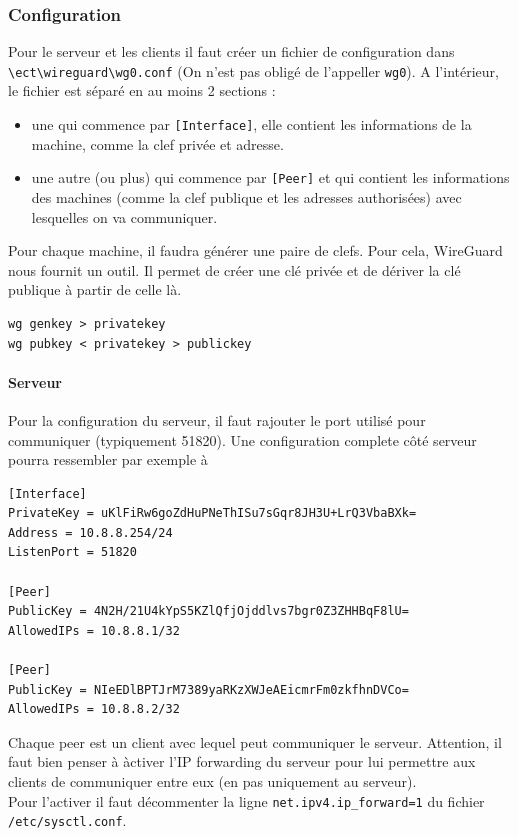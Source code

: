 \documentclass[a4paper, 12pt]{article}
\begin{document}
\subsubsection{Configuration}
Pour le serveur et les clients il faut créer un fichier de configuration dans \\\verb+\ect\wireguard\wg0.conf+ (On n'est pas obligé de l'appeller \verb+wg0+). A l'intérieur, le fichier est séparé en au moins 2 sections :
\begin{itemize}
\item une qui commence par \verb+[Interface]+, elle contient les informations de la machine, comme la clef privée et adresse.
\item une autre (ou plus) qui commence par \verb+[Peer]+ et qui contient les informations des machines (comme la clef publique et les adresses authorisées) avec lesquelles on va communiquer. \\
\end{itemize}

Pour chaque machine, il faudra générer une paire de clefs. Pour cela, WireGuard nous fournit un outil. Il permet de créer une clé privée et de dériver la clé publique à partir de celle là.

\begin{center}
\begin{minipage}{.6\linewidth}
\begin{lstlisting}[language = shell]
wg genkey > privatekey
wg pubkey < privatekey > publickey
\end{lstlisting}
\end{minipage}
\end{center}

\paragraph{Serveur}
Pour la configuration du serveur, il faut rajouter le port utilisé pour communiquer (typiquement 51820). Une configuration complete côté serveur pourra ressembler par exemple à

\begin{lstlisting}[language = shell]
[Interface]
PrivateKey = uKlFiRw6goZdHuPNeThISu7sGqr8JH3U+LrQ3VbaBXk= 
Address = 10.8.8.254/24
ListenPort = 51820

[Peer]
PublicKey = 4N2H/21U4kYpS5KZlQfjOjddlvs7bgr0Z3ZHHBqF8lU=
AllowedIPs = 10.8.8.1/32

[Peer] 
PublicKey = NIeEDlBPTJrM7389yaRKzXWJeAEicmrFm0zkfhnDVCo=  
AllowedIPs = 10.8.8.2/32
\end{lstlisting}
Chaque peer est un client avec lequel peut communiquer le serveur. Attention, il faut bien penser à àctiver l'IP forwarding du serveur pour lui permettre aux clients de communiquer entre eux (en pas uniquement au serveur). \\
Pour l'activer il faut décommenter la ligne \verb+net.ipv4.ip_forward=1+ du fichier \\\verb+/etc/sysctl.conf+.
\end{document}
